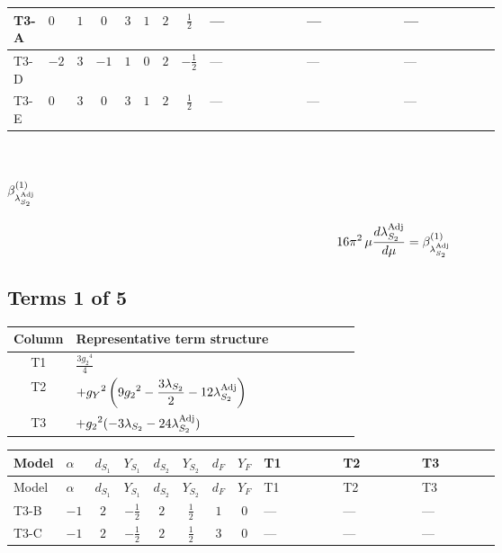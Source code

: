 \documentclass[8pt]{article}
\begin{document}
\begin{landscape}
\begin{longtable}{@{}llcccccc >{\raggedright\arraybackslash}p{0.21\linewidth} >{\raggedright\arraybackslash}p{0.21\linewidth} >{\raggedright\arraybackslash}p{0.21\linewidth}@{}}
\midrule
T3-A & $0$ & $1$ & $0$ & $3$ & $1$ & $2$ & $\frac{1}{2}$ & --- & --- & --- \\
\midrule
T3-D & $-2$ & $3$ & $-1$ & $1$ & $0$ & $2$ & $-\frac{1}{2}$ & --- & --- & --- \\
\midrule
T3-E & $0$ & $3$ & $0$ & $3$ & $1$ & $2$ & $\frac{1}{2}$ & --- & --- & --- \\
\midrule
\bottomrule
\end{longtable}
\clearpage
\section*{$\beta_{\lambda_{S_2}^{\rm Adj}}^{(1)}$}
\[16\pi^2\,\mu\frac{d \lambda_{S_2}^{\rm Adj}}{d\mu}=\beta_{\lambda_{S_2}^{\rm Adj}}^{(1)}\]
\subsection*{Terms 1 of 5}
\begin{center}
\begin{tabular}{@{}c >{\raggedright\arraybackslash}p{0.82\linewidth}@{}}
\toprule
Column & Representative term structure \\
\midrule
T1 & \(\displaystyle \frac{3 {g_2}^4}{4}\) \\
\midrule
T2 & \(\displaystyle +{g_Y}^2 \left(9 {g_2}^2-\frac{3 {\lambda_{S_2}}}{2}-12 {\lambda_{S_2}^{\rm Adj}}\right)\) \\
\midrule
T3 & \(\displaystyle +{g_2}^2 (-3 {\lambda_{S_2}}-24 {\lambda_{S_2}^{\rm Adj}})\) \\
\midrule
\bottomrule
\end{tabular}
\end{center}
\smallskip
\tiny
\begin{longtable}{@{}llcccccc >{\raggedright\arraybackslash}p{0.21\linewidth} >{\raggedright\arraybackslash}p{0.21\linewidth} >{\raggedright\arraybackslash}p{0.21\linewidth}@{}}
\toprule
Model & $\alpha$ & $d_{S_1}$ & $Y_{S_1}$ & $d_{S_2}$ & $Y_{S_2}$ & $d_F$ & $Y_F$ & T1 & T2 & T3 \\
\midrule
\endfirsthead
\toprule
Model & $\alpha$ & $d_{S_1}$ & $Y_{S_1}$ & $d_{S_2}$ & $Y_{S_2}$ & $d_F$ & $Y_F$ & T1 & T2 & T3 \\
\midrule
\endhead
T3-B & $-1$ & $2$ & $-\frac{1}{2}$ & $2$ & $\frac{1}{2}$ & $1$ & $0$ & --- & --- & --- \\
\midrule
T3-C & $-1$ & $2$ & $-\frac{1}{2}$ & $2$ & $\frac{1}{2}$ & $3$ & $0$ & --- & --- & --- \\
\midrule

\end{longtable}
\end{landscape}
\end{document}
